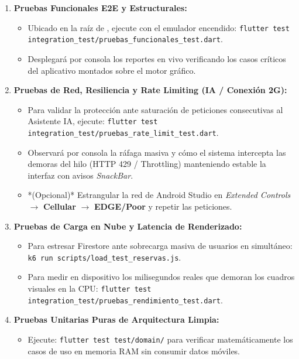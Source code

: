 \documentclass[12pt,letterpaper]{report}
\newcommand{\pathtext}[1]{\texttt{\detokenize{#1}}}
\begin{document}
\begin{enumerate}
    \item \textbf{Pruebas Funcionales E2E y Estructurales:}
    \begin{itemize}
        \item Ubicado en la raíz de \pathtext{HostSigchos-Tests}, ejecute con el emulador encendido: \linebreak \texttt{flutter test integration\_test/pruebas\_funcionales\_test.dart}.
        \item Desplegará por consola los reportes en vivo verificando los casos críticos del aplicativo montados sobre el motor gráfico.
    \end{itemize}
    \item \textbf{Pruebas de Red, Resiliencia y Rate Limiting (IA / Conexión 2G):}
    \begin{itemize}
        \item Para validar la protección ante saturación de peticiones consecutivas al Asistente IA, ejecute: \linebreak \texttt{flutter test integration\_test/pruebas\_rate\_limit\_test.dart}.
        \item Observará por consola la ráfaga masiva y cómo el sistema intercepta las demoras del hilo (HTTP 429 / Throttling) manteniendo estable la interfaz con avisos \textit{SnackBar}.
        \item *(Opcional)* Estrangular la red de Android Studio en \textit{Extended Controls} $\rightarrow$ \textbf{Cellular} $\rightarrow$ \textbf{EDGE/Poor} y repetir las peticiones.
    \end{itemize}
    \item \textbf{Pruebas de Carga en Nube y Latencia de Renderizado:}
    \begin{itemize}
        \item Para estresar Firestore ante sobrecarga masiva de usuarios en simultáneo: \linebreak \texttt{k6 run scripts/load\_test\_reservas.js}.
        \item Para medir en dispositivo los milisegundos reales que demoran los cuadros visuales en la CPU: \linebreak \texttt{flutter test integration\_test/pruebas\_rendimiento\_test.dart}.
    \end{itemize}
    \item \textbf{Pruebas Unitarias Puras de Arquitectura Limpia:}
    \begin{itemize}
        \item Ejecute: \texttt{flutter test test/domain/} para verificar matemáticamente los casos de uso en memoria RAM sin consumir datos móviles.

\end{itemize}
\end{enumerate}
\end{document}
